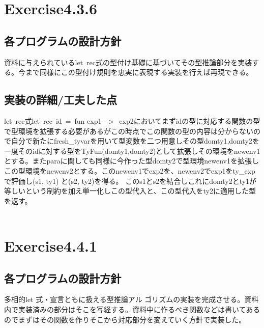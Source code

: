 \documentclass[a4paper,11pt,oneside,openany]{jsarticle}
\begin{document}
\section{Exercise4.3.6}
\subsection{各プログラムの設計方針}
  資料に与えられているlet\ rec式の型付け基礎に基づいてその型推論部分を実装する。今まで同様にこの型付け規則を忠実に表現する実装を行えば再現できる。
\subsection{実装の詳細/工夫した点}
  let\ rec式let\ rec\ id\ =\ fun exp1 -$>$\ exp2においてまずidの型に対応する関数の型で型環境を拡張する必要があるがこの時点でこの関数の型の内容は分からないので自分で新たにfresh\_tyvarを用いて型変数を二つ用意しその型domty1,domty2を一度そのidに対する型をTyFun(domty1,domty2)として拡張しその環境をnewenv1とする。またparaに関しても同様に今作った型domty2で型環境newenv1を拡張しこの型環境をnewenv2とする。このnewenv1でexp2を、newenv2でexp1をty\_expで評価し(s1, ty1) と(s2, ty2)を得る。
  このs1とs2を結合しこれにdomty2とty1が等しいという制約を加え単一化しこの型代入と、この型代入をty2に適用した型を返す。
\\\\

\section{Exercise4.4.1}
\subsection{各プログラムの設計方針}
  多相的let 式・宣言ともに扱える型推論アル ゴリズムの実装を完成させる。資料内で実装済みの部分はそこを写経する。資料中に作るべき関数などは書いてあるのでまずはその関数を作りそこから対応部分を変えていく方針で実装した。
\end{document}
